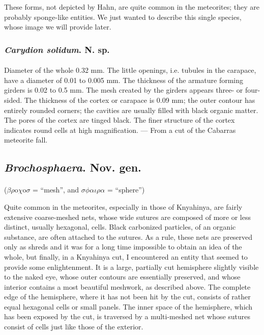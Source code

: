 \documentclass[a4paper, 12pt, oneside]{article}
\begin{document}
These forms, not depicted by Hahn, are quite common in the meteorites; they are probably sponge-like entities. We just wanted to describe this single species, whose image we will provide later.
\subsubsection{\emph{Carydion solidum}. N. sp.}
\paragraph{}
Diameter of the whole 0.32 mm. The little openings, i.e. tubules in the carapace, have a diameter of 0.01 to 0.005 mm. The thickness of the armature forming girders is 0.02 to 0.5 mm. The mesh created by the girders appears three- or four-sided. The thickness of the cortex or carapace is 0.09 mm; the outer contour has entirely rounded corners; the cavities are usually filled with black organic matter. The pores of the cortex are tinged black. The finer structure of the cortex indicates round cells at high magnification. --- From a cut of the Cabarras meteorite fall.
\subsection{\emph{Brochosphaera}. Nov. gen.}
\paragraph{}
($\beta\rho$o$\chi$o$\sigma$ = ``mesh'', and $\sigma\phi\alpha\iota\rho\alpha$ = ``sphere'')%

Quite common in the meteorites, especially in those of Knyahinya, are fairly extensive coarse-meshed nets, whose wide sutures are composed of more or less distinct, usually hexagonal, cells. Black carbonized particles, of an organic substance, are often attached to the sutures. As a rule, these nets are preserved only as shreds and it was for a long time impossible to obtain an idea of the whole, but finally, in a Knyahinya cut, I encountered an entity that seemed to provide some enlightenment. It is a large, partially cut hemisphere slightly visible to the naked eye, whose outer contours are essentially preserved, and whose interior contains a most beautiful meshwork, as described above. The complete edge of the hemisphere, where it has not been hit by the cut, consists of rather equal hexagonal cells or small panels. The inner space of the hemisphere, which has been exposed by the cut, is traversed by a multi-meshed net whose sutures consist of cells just like those of the exterior.
\end{document}
